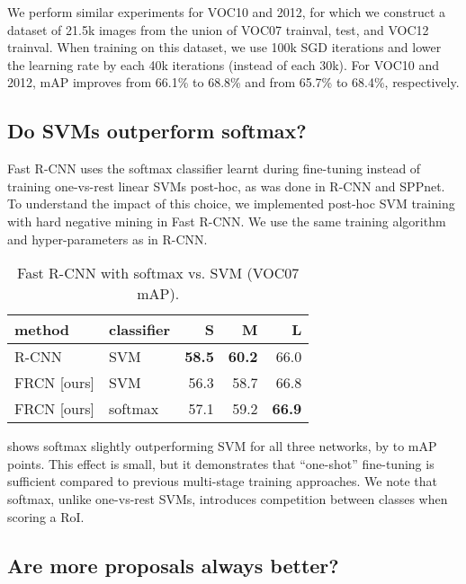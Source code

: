 \documentclass[10pt,twocolumn,letterpaper]{article}
\newcommand{\roi}{RoI\xspace}
\newcommand{\Sm}{{\bf S}\xspace}
\newcommand{\Med}{{\bf M}\xspace}
\newcommand{\Lg}{{\bf L}\xspace}
\begin{document}
We perform similar experiments for VOC10 and 2012, for which we construct a dataset of 21.5k images from the union of VOC07 trainval, test, and VOC12 trainval.
When training on this dataset, we use 100k SGD iterations and lower the learning rate by  each 40k iterations (instead of each 30k).
For VOC10 and 2012, mAP improves from 66.1\% to 68.8\% and from 65.7\% to 68.4\%, respectively.


\subsection{Do SVMs outperform softmax?}
Fast R-CNN uses the softmax classifier learnt during fine-tuning instead of training one-vs-rest linear SVMs post-hoc, as was done in R-CNN and SPPnet.
To understand the impact of this choice, we implemented post-hoc SVM training with hard negative mining in Fast R-CNN.
We use the same training algorithm and hyper-parameters as in R-CNN.
\begin{table}[h!]
\begin{center}
\setlength{\tabcolsep}{6pt}
\renewcommand{\arraystretch}{1.1}
\small
\begin{tabular}{l|l|r|r|r}
  method & classifier & \Sm & \Med & \Lg \\
\hline
R-CNN \cite{girshick2014rcnn,rcnn-pami} & SVM & \bf{58.5} & \bf{60.2} & 66.0 \\
\hline
FRCN [ours] & SVM & 56.3 & 58.7 & 66.8 \\
FRCN [ours] & softmax & 57.1 & 59.2 & \bf{66.9} \\
\end{tabular}
\end{center}
\caption{Fast R-CNN with softmax vs. SVM (VOC07 mAP).}
\vspace{-0.5em}
\end{table}

 shows softmax slightly outperforming SVM for all three networks, by  to  mAP points.
This effect is small, but it demonstrates that ``one-shot'' fine-tuning is sufficient compared to previous multi-stage training approaches.
We note that softmax, unlike one-vs-rest SVMs, introduces competition between classes when scoring a \roi.

\subsection{Are more proposals always better?}
\end{document}
